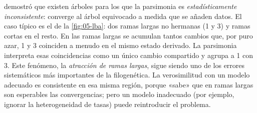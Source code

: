 \textcite{c05-felsenstein1978} demostró que existen árboles para los que la parsimonia es \emph{estadísticamente inconsistente}: converge al árbol equivocado a medida que se añaden datos. El caso típico es el de la \cref{fig:05-lba}: dos ramas largas no hermanas (1 y 3) y ramas cortas en el resto. En las ramas largas se acumulan tantos cambios que, por puro azar, 1 y 3 coinciden a menudo en el mismo estado derivado. La parsimonia interpreta esas coincidencias como un único cambio compartido y agrupa a 1 con 3. Este fenómeno, la \emph{atracción de ramas largas}, sigue siendo uno de los errores sistemáticos más importantes de la filogenética. La verosimilitud con un modelo adecuado es consistente en esa misma región, porque «sabe» que en ramas largas son esperables las convergencias; pero un modelo inadecuado (por ejemplo, ignorar la heterogeneidad de tasas) puede reintroducir el problema.

